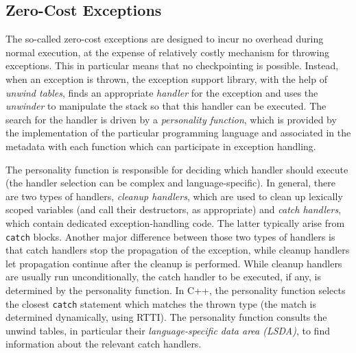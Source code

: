 \subsection{Zero-Cost Exceptions}\label{sec:lang:zerocost}

The so-called zero-cost exceptions are designed to incur no overhead
during normal execution, at the expense of relatively costly mechanism
for throwing exceptions. This in particular means that no checkpointing
is possible. Instead, when an exception is thrown, the exception support
library, with the help of \emph{unwind tables}, finds an appropriate
\emph{handler} for the exception and uses the \emph{unwinder} to
manipulate the stack so that this handler can be executed. The search
for the handler is driven by a \emph{personality function}, which is
provided by the implementation of the particular programming language
and associated in the metadata with each function which can participate in exception handling.

The personality function is responsible for deciding which handler
should execute (the handler selection can be complex and
language-specific). In general, there are two types of handlers,
\emph{cleanup handlers}, which are used to clean up lexically scoped
variables (and call their destructors, as appropriate) and \emph{catch
handlers}, which contain dedicated exception-handling code. The latter
typically arise from \texttt{catch} blocks. Another major difference
between those two types of handlers is that catch handlers stop the
propagation of the exception, while cleanup handlers let propagation
continue after the cleanup is performed. While cleanup handlers are
usually run unconditionally, the catch handler to be executed, if any,
is determined by the personality function. In C++, the personality function selects the
closest \texttt{catch} statement which matches the thrown type (the
match is determined dynamically, using RTTI). The personality function
consults the unwind tables, in particular their \emph{language-specific
data area (LSDA)}, to find information about the relevant catch
handlers.

